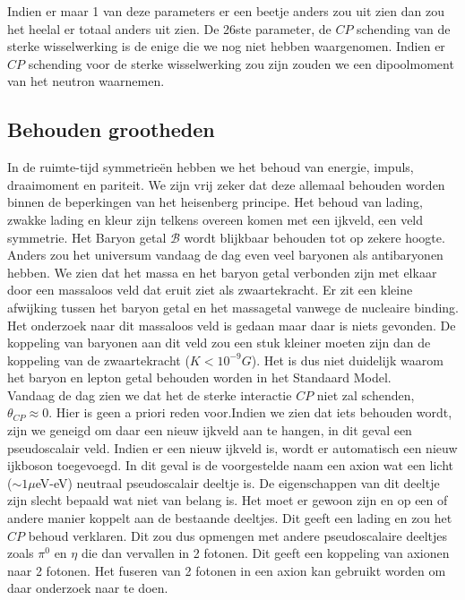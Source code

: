 \documentclass[../main.tex]{subfiles}
\begin{document}
Indien er maar 1 van deze parameters er een beetje anders zou uit zien dan zou het heelal er totaal anders uit zien. De 26ste parameter, de $CP$ schending van de sterke wisselwerking is de enige die we nog niet hebben waargenomen. Indien er $CP$ schending voor de sterke wisselwerking zou zijn zouden we een dipoolmoment van het neutron waarnemen.

\subsection{Behouden grootheden}%
\label{sub:behouden_grootheden}

In de ruimte-tijd symmetrieën hebben we het behoud van energie, impuls, draaimoment en pariteit. We zijn vrij zeker dat deze allemaal behouden worden binnen de beperkingen van het heisenberg principe. Het behoud van lading, zwakke lading en kleur zijn telkens overeen komen met een ijkveld, een veld symmetrie. Het Baryon getal $\mathcal{B}$ wordt blijkbaar behouden tot op zekere hoogte. Anders zou het universum vandaag de dag even veel baryonen als antibaryonen hebben. We zien dat het massa en het baryon getal verbonden zijn met elkaar door een massaloos veld dat eruit ziet als zwaartekracht. Er zit een kleine afwijking tussen het baryon getal en het massagetal vanwege de nucleaire binding. Het onderzoek naar dit massaloos veld is gedaan maar daar is niets gevonden. De koppeling van baryonen aan dit veld zou een stuk kleiner moeten zijn dan de koppeling van de zwaartekracht ($K<10^{-9}G$). Het is dus niet duidelijk waarom het baryon en lepton getal behouden worden in het Standaard Model.\\
Vandaag de dag zien we dat het de sterke interactie $CP$ niet zal schenden, $\theta_{C P} \approx 0$. Hier is geen a priori reden voor.Indien we zien dat iets behouden wordt, zijn we geneigd om daar een nieuw ijkveld aan te hangen, in dit geval een pseudoscalair veld. Indien er een nieuw ijkveld is, wordt er automatisch een nieuw ijkboson toegevoegd. In dit geval is de voorgestelde naam een axion wat een licht ($\sim 1\mu$eV-eV) neutraal pseudoscalair deeltje is. De eigenschappen van dit deeltje zijn slecht bepaald wat niet van belang is. Het moet er gewoon zijn en op een of andere manier koppelt aan de bestaande deeltjes. Dit geeft een lading en zou het $CP$ behoud verklaren. Dit zou dus opmengen met andere pseudoscalaire deeltjes zoals $\pi^0$ en $\eta$ die dan vervallen in 2 fotonen. Dit geeft een koppeling van axionen naar 2 fotonen. Het fuseren van 2 fotonen in een axion kan gebruikt worden om daar onderzoek naar te doen.
\end{document}
